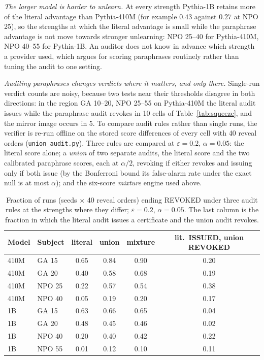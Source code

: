 \documentclass[11pt]{article}
\theoremstyle{definition}
\theoremstyle{remark}
\newcommand{\eps}{\varepsilon}
\begin{document}
\emph{The larger model is harder to unlearn.} At every strength Pythia-1B retains
more of the literal advantage than Pythia-410M (for example $0.43$ against $0.27$ at
NPO 25), so the strengths at which the literal advantage is small while the
paraphrase advantage is not move towards stronger unlearning: NPO 25--40 for
Pythia-410M, NPO 40--55 for Pythia-1B. An auditor does not know in advance which
strength a provider used, which argues for scoring paraphrases routinely rather than
tuning the audit to one setting.

\emph{Auditing paraphrases changes verdicts where it matters, and only there.}
Single-run verdict counts are noisy, because two tests near their thresholds disagree
in both directions: in the region GA 10--20, NPO 25--55 on Pythia-410M the literal
audit issues while the paraphrase audit revokes in 10 cells of
Table~\ref{tab:squeeze}, and the mirror image occurs in 5. To compare audit rules
rather than single runs, the verifier is re-run offline on the stored score
differences of every cell with 40 reveal orders (\texttt{union\_audit.py}). Three
rules are compared at $\eps=0.2$, $\alpha=0.05$: the literal score alone; a
\emph{union} of two separate audits, the literal score and the two calibrated
paraphrase scores, each at $\alpha/2$, revoking if either revokes and issuing only if
both issue (by the Bonferroni bound its false-alarm rate under the exact null is at
most $\alpha$); and the six-score \emph{mixture} engine used above.

\begin{table}[h]
\centering
\caption{Fraction of runs (seeds $\times$ 40 reveal orders) ending REVOKED under
three audit rules at the strengths where they differ; $\eps=0.2$, $\alpha=0.05$.
The last column is the fraction in which the literal audit issues a certificate and
the union audit revokes.}\label{tab:union}
\small
\begin{tabular}{llcccc}
\toprule
Model & Subject & literal & union & mixture & lit.\ ISSUED, union REVOKED \\
\midrule
410M & GA 15  & 0.65 & 0.84 & 0.90 & 0.20 \\
410M & GA 20  & 0.40 & 0.58 & 0.68 & 0.19 \\
410M & NPO 25 & 0.22 & 0.57 & 0.54 & 0.38 \\
410M & NPO 40 & 0.05 & 0.19 & 0.20 & 0.17 \\
1B   & GA 15  & 0.63 & 0.66 & 0.65 & 0.04 \\
1B   & GA 20  & 0.48 & 0.45 & 0.46 & 0.02 \\
1B   & NPO 40 & 0.20 & 0.40 & 0.42 & 0.22 \\
1B   & NPO 55 & 0.01 & 0.12 & 0.10 & 0.11 \\
\bottomrule
\end{tabular}
\end{table}
\end{document}

